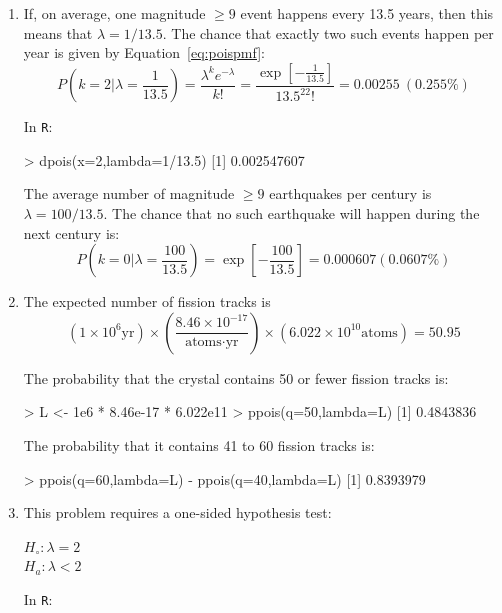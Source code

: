 \begin{enumerate}
\item If, on average, one magnitude $\geq{9}$ event happens every 13.5
  years, then this means that $\lambda=1/13.5$. The chance that
  exactly two such events happen per year is given by
  Equation~\ref{eq:poispmf}:
  \[
  P\left(k=2|\lambda=\frac{1}{13.5}\right) = \frac{\lambda^k
    e^{-\lambda}}{k!} = \frac{\exp\left[-\frac{1}{13.5}\right]}{13.5^22!} =
  0.00255 ~ (0.255\%)
  \]

  In \texttt{R}:

\begin{console}
> dpois(x=2,lambda=1/13.5)
[1] 0.002547607
\end{console}

The average number of magnitude $\geq{9}$ earthquakes per century is
$\lambda={100/13.5}$. The chance that no such earthquake will happen
during the next century is:
  \[
  P\left(k=0|\lambda=\frac{100}{13.5}\right) =
  \exp\left[{-\frac{100}{13.5}}\right] =
  0.000607 (0.0607\%)
  \]

\item The expected number of fission tracks is
  \[
  (1\times{10}^{6}\mbox{yr})
  \times
  \left(\frac{{8.46}\times{10}^{-17}}{\mbox{atoms}\cdot\mbox{yr}}\right)
  \times({6.022}\times{10}^{10}\mbox{atoms})=50.95
  \]

  The probability that the crystal contains 50 or fewer fission tracks
  is:

\begin{console}
> L <- 1e6 * 8.46e-17 * 6.022e11
> ppois(q=50,lambda=L)
[1] 0.4843836
\end{console}

The probability that it contains 41 to 60 fission tracks is:

\begin{console}
> ppois(q=60,lambda=L) - ppois(q=40,lambda=L)
[1] 0.8393979
\end{console}

\item This problem requires a one-sided hypothesis test:

  $H_\circ: \lambda=2$\\
  $H_a: \lambda<2$

  In \texttt{R}:



\end{enumerate}
